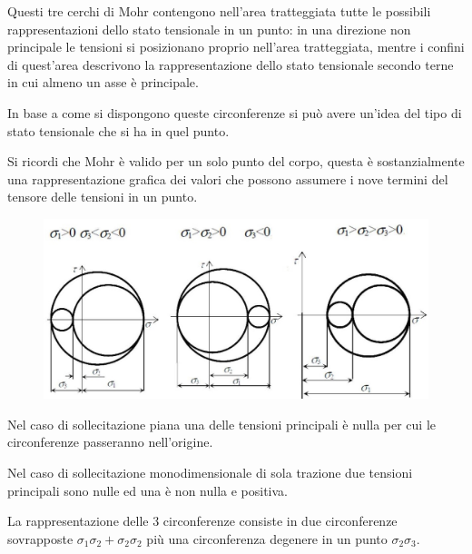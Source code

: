 \documentclass{article}
\begin{document}
\begin{adjustwidth}{2in}{}
	Questi tre cerchi di Mohr contengono nell'area tratteggiata tutte le possibili rappresentazioni dello stato tensionale in un punto: in una direzione non principale le
	tensioni si posizionano proprio nell’area
	tratteggiata, mentre i confini di quest'area descrivono la rappresentazione dello stato tensionale secondo terne in cui almeno un asse è principale. \newline 
	
	In base a come si dispongono queste circonferenze si può avere un'idea del tipo di stato tensionale che si ha in quel punto. \newline
	
	Si ricordi che Mohr è valido per un solo punto del corpo, questa è sostanzialmente una rappresentazione grafica dei valori che possono assumere i nove termini del tensore delle tensioni in un punto.
	
\begin{figure}[H]
	\centering
	\includegraphics[width=0.8\linewidth]{immagini/1.PARTE7_Pagina_42}
\end{figure}
\newpage
	Nel caso di sollecitazione piana una delle tensioni principali è nulla per cui le circonferenze passeranno nell'origine. \newline 
	
	Nel caso di sollecitazione monodimensionale di sola trazione due tensioni principali sono nulle ed una è non nulla e positiva. 
	
	La rappresentazione delle 3 circonferenze consiste in due circonferenze sovrapposte $\sigma_1\sigma_2 + \sigma_2\sigma_2$  più una circonferenza degenere in un punto $\sigma_2\sigma_3$. \newline 
	

\end{adjustwidth}
\end{document}

